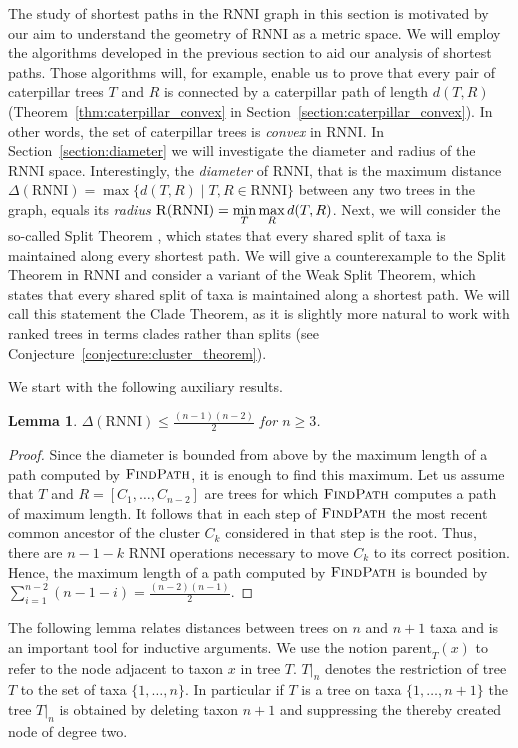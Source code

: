 \documentclass{amsart}
\newcommand{\parent}{\mathrm{parent}}
\newcommand{\rnni}{\mathrm{RNNI}}
\newcommand{\findpath}{\textsc{FindPath}}
\newcommand{\rad}{\textsc{R}}
\newtheorem{lemma}[definition]{Lemma}
\begin{document}
The study of shortest paths in the $\rnni$ graph in this section is motivated by our aim to understand the geometry of $\rnni$ as a metric space.
We will employ the algorithms developed in the previous section to aid our analysis of shortest paths.
Those algorithms will, for example, enable us to prove that every pair of caterpillar trees $T$ and $R$ is connected by a caterpillar path of length $d(T,R)$ (Theorem~\ref{thm:caterpillar_convex} in Section~\ref{section:caterpillar_convex}).
In other words, the set of caterpillar trees is \emph{convex} in $\rnni$.
In Section~\ref{section:diameter} we will investigate the diameter and radius of the $\rnni$ space.
Interestingly, the \emph{diameter} of $\rnni$, that is the maximum distance $\Delta(\rnni) = \max \{d(T, R) \mid T, R \in \rnni\}$ between any two trees in the graph, equals its \emph{radius} $\rad(\rnni) = \min\limits_T \max\limits_R d(T,R)$.
Next, we will consider the so-called Split Theorem \autocite{Gavryushkin2018-ol}, which states that every shared split of taxa is maintained along every shortest path.
We will give a counterexample to the Split Theorem in $\rnni$ and consider a variant of the Weak Split Theorem, which states that every shared split of taxa is maintained along a shortest path.
We will call this statement the Clade Theorem, as it is slightly more natural to work with ranked trees in terms clades rather than splits (see Conjecture~\ref{conjecture:cluster_theorem}).

We start with the following auxiliary results.

\begin{lemma}
$\Delta(\rnni) \leq \frac{(n-1)(n-2)}{2}$ for $n \geq 3$.
\label{lemma:diameter_bound}
\end{lemma}

\begin{proof}
Since the diameter is bounded from above by the maximum length of a path computed by $\findpath$, it is enough to find this maximum.
Let us assume that $T$ and $R = [C_1, \ldots, C_{n-2}]$ are trees for which $\findpath$ computes a path of maximum length.
It follows that in each step of $\findpath$ the most recent common ancestor of the cluster $C_k$ considered in that step is the root.
Thus, there are $n-1-k$ $\rnni$ operations necessary to move $C_k$ to its correct position.
Hence, the maximum length of a path computed by $\findpath$ is bounded by $\sum\limits_{i = 1}^{n-2} (n-1-i) = \frac{(n-2)(n-1)}{2}$.
\end{proof}

The following lemma relates distances between trees on $n$ and $n+1$ taxa and is an important tool for inductive arguments.
We use the notion $\parent_T(x)$ to refer to the node adjacent to taxon $x$ in tree $T$.
$T{\big|}_n$ denotes the restriction of tree $T$ to the set of taxa $\{1, \ldots, n\}$.
In particular if $T$ is a tree on taxa $\{1, \ldots, n+1\}$ the tree $T{\big|}_n$ is obtained by deleting taxon $n+1$ and suppressing the thereby created node of degree two.
\end{document}

